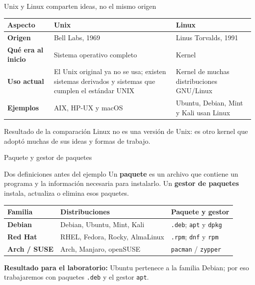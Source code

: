 \documentclass[aspectratio=169,10pt,c]{beamer}
\begin{document}
\begin{frame}{Unix y Linux comparten ideas, no el mismo origen}
\begin{center}
\small
\begin{tabular}{>{\bfseries}p{3.1cm}p{3.9cm}p{4.0cm}}
\toprule
Aspecto & Unix & Linux \\
\midrule
Origen & Bell Labs, 1969 & Linus Torvalds, 1991 \\
Qué era al inicio & Sistema operativo completo & Kernel \\
Uso actual & El Unix original ya no se usa; existen sistemas derivados y sistemas que cumplen el estándar UNIX & Kernel de muchas distribuciones GNU/Linux \\
Ejemplos & AIX, HP-UX y macOS & Ubuntu, Debian, Mint y Kali usan Linux \\
\bottomrule
\end{tabular}
\end{center}
\begin{alertblock}{Resultado de la comparación}
\small Linux no es una versión de Unix: es otro kernel que adoptó muchas de sus ideas y formas de trabajo.
\end{alertblock}
\end{frame}

\begin{frame}{Paquete y gestor de paquetes}
\begin{block}{Dos definiciones antes del ejemplo}
\small Un \textbf{paquete} es un archivo que contiene un programa y la información necesaria para instalarlo. Un \textbf{gestor de paquetes} instala, actualiza o elimina esos paquetes.
\end{block}
\begin{center}
\small
\begin{tabular}{>{\bfseries}p{2.6cm}p{4.3cm}p{3.8cm}}
\toprule
Familia & Distribuciones & Paquete y gestor \\
\midrule
Debian & Debian, Ubuntu, Mint, Kali & \texttt{.deb}; \texttt{apt} y \texttt{dpkg} \\
Red Hat & RHEL, Fedora, Rocky, AlmaLinux & \texttt{.rpm}; \texttt{dnf} y \texttt{rpm} \\
Arch / SUSE & Arch, Manjaro, openSUSE & \texttt{pacman} / \texttt{zypper} \\
\bottomrule
\end{tabular}
\end{center}
\small\textbf{Resultado para el laboratorio:} Ubuntu pertenece a la familia Debian; por eso trabajaremos con paquetes \texttt{.deb} y el gestor \texttt{apt}.
\end{frame}
\end{document}

